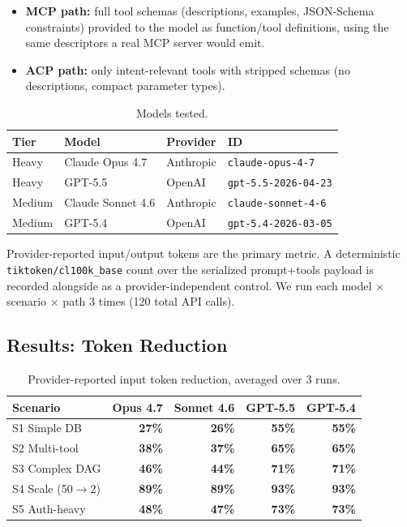 \documentclass[11pt,a4paper]{article}
\begin{document}
\begin{itemize}
  \item \textbf{MCP path:} full tool schemas (descriptions, examples,
    JSON-Schema constraints) provided to the model as function/tool
    definitions, using the same descriptors a real MCP server would emit.
  \item \textbf{ACP path:} only intent-relevant tools with stripped schemas
    (no descriptions, compact parameter types).
\end{itemize}

\begin{table}[h]
\centering
\caption{Models tested.}
\begin{tabular}{@{}llll@{}}
\toprule
Tier & Model & Provider & ID \\
\midrule
Heavy  & Claude Opus 4.7  & Anthropic & \texttt{claude-opus-4-7} \\
Heavy  & GPT-5.5          & OpenAI    & \texttt{gpt-5.5-2026-04-23} \\
Medium & Claude Sonnet 4.6 & Anthropic & \texttt{claude-sonnet-4-6} \\
Medium & GPT-5.4          & OpenAI    & \texttt{gpt-5.4-2026-03-05} \\
\bottomrule
\end{tabular}
\end{table}

Provider-reported input/output tokens are the primary metric. A deterministic
\texttt{tiktoken/cl100k\_base} count over the serialized prompt+tools payload
is recorded alongside as a provider-independent control. We run each
model $\times$ scenario $\times$ path 3 times (120 total API calls).

\subsection{Results: Token Reduction}

\begin{table}[h]
\centering
\caption{Provider-reported input token reduction, averaged over 3 runs.}
\begin{tabular}{@{}lrrrr@{}}
\toprule
Scenario & Opus 4.7 & Sonnet 4.6 & GPT-5.5 & GPT-5.4 \\
\midrule
S1 Simple DB        & \textbf{27\%} & \textbf{26\%} & \textbf{55\%} & \textbf{55\%} \\
S2 Multi-tool       & \textbf{38\%} & \textbf{37\%} & \textbf{65\%} & \textbf{65\%} \\
S3 Complex DAG      & \textbf{46\%} & \textbf{44\%} & \textbf{71\%} & \textbf{71\%} \\
S4 Scale (50$\to$2) & \textbf{89\%} & \textbf{89\%} & \textbf{93\%} & \textbf{93\%} \\
S5 Auth-heavy       & \textbf{48\%} & \textbf{47\%} & \textbf{73\%} & \textbf{73\%} \\
\bottomrule
\end{tabular}
\end{table}
\end{document}
